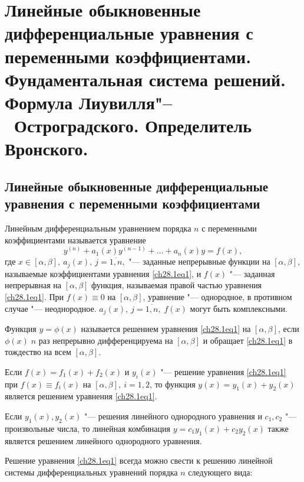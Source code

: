 \chapter{Линейные обыкновенные дифференциальные уравнения с переменными коэффициентами. Фундаментальная система решений. Формула Лиувилля"--~Остроградского. Определитель Вронского.}

\section{Линейные обыкновенные дифференциальные уравнения с переменными коэффициентами}

Линейным дифференциальным уравнением порядка $n$ с переменными коэффициентами называется уравнение 
\begin{equation} \label{ch28.1eq1}
y^{(n)} + a_1(x)y^{(n - 1)} + \ldots + a_n(x)y = f(x),
\end{equation}
где $x \in [\alpha, \beta], \: a_j(x), \: j = \overline{1,n},$ "--- заданные непрерывные функции на $[\alpha, \beta]$, называемые коэффициентами уравнения \eqref{ch28.1eq1}, и $f(x)$ "--- заданная непрерывная на $[\alpha, \beta]$ функция, называемая правой частью уравнения \eqref{ch28.1eq1}. При $f(x) \equiv 0$ на $[\alpha, \beta]$, уравнение "--- однородное, в противном случае "--- неоднородное. $a_j(x), \: j = \overline{1,n}, \; f(x)$ могут быть комплексными.

Функция $y = \phi(x)$ называется решением уравнения \eqref{ch28.1eq1} на $[\alpha, \beta]$, если $\phi(x) \; n$ раз непрерывно дифференцируема на $[\alpha, \beta]$ и обращает \eqref{ch28.1eq1} в тождество на всем $[\alpha, \beta]$.

\begin{lemm}
Если $f(x) = f_1(x) + f_2(x)$ и $y_i(x)$ "--- решение уравнения \eqref{ch28.1eq1} при $f(x) \equiv f_i(x)$ на $[\alpha, \beta], \: i = 1,2$, то функция $y(x) = y_1(x) + y_2(x)$ является решением уравнения \eqref{ch28.1eq1}.
\end{lemm}  

\begin{cons}
Если $y_1(x), y_2(x)$ "--- решения линейного однородного уравнения и $c_1, c_2$ "--- произвольные числа, то линейная комбинация $y = c_1y_1(x) + c_2y_2(x)$ также является решением линейного однородного уравнения.
\end{cons}

Решение уравнения \eqref{ch28.1eq1} всегда можно свести к решению линейной системы дифференциальных уравнений порядка $n$ следующего вида:

